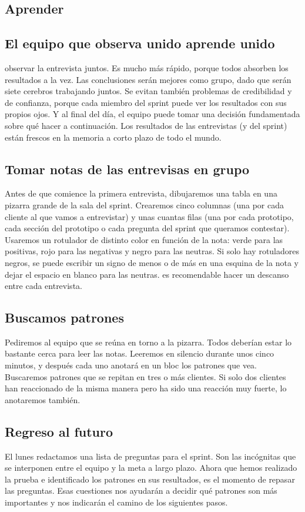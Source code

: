 \documentclass[10pt]{article}
\begin{document}
\begin{multicols}{2}
\section*{Aprender}
\subsection*{El equipo que observa unido aprende unido}
 observar la entrevista juntos. Es mucho más rápido, porque todos absorben los resultados a la vez. Las conclusiones serán mejores como grupo, dado que serán siete cerebros trabajando juntos. Se evitan también problemas de credibilidad y de confianza, porque cada miembro del sprint puede ver los resultados con sus propios ojos. Y al final del día, el equipo puede tomar una decisión fundamentada sobre qué hacer a continuación. Los resultados de las entrevistas (y del sprint) están frescos en la memoria a corto plazo de todo el mundo.
\subsection*{Tomar notas de las entrevisas en grupo}
Antes de que comience la primera entrevista, dibujaremos una tabla en una pizarra grande de la sala del sprint. Crearemos cinco columnas (una por cada cliente al que vamos a entrevistar) y unas cuantas filas (una por cada prototipo, cada sección del prototipo o cada pregunta del sprint que queramos contestar).\\
Usaremos un rotulador de distinto color en función de la nota: verde para las positivas, rojo para las negativas y negro para las neutras. Si solo hay rotuladores negros, se puede escribir un signo de menos o de más en una esquina de la nota y dejar el espacio en blanco para las neutras. es recomendable hacer un descanso entre cada entrevista.\\
\subsection*{Buscamos patrones}
Pediremos al equipo que se reúna en torno a la pizarra. Todos deberían estar lo bastante cerca para leer las notas. Leeremos en silencio durante unos cinco minutos, y después cada uno anotará en un bloc los patrones que vea. Buscaremos patrones que se repitan en tres o más clientes. Si solo dos clientes han reaccionado de la misma manera pero ha sido una reacción muy fuerte, lo anotaremos también.
\subsection*{Regreso al futuro}
El lunes redactamos una lista de preguntas para el sprint. Son las incógnitas que se interponen entre el equipo y la meta a largo plazo. Ahora que hemos realizado la prueba e identificado los patrones en sus resultados, es el momento de repasar las preguntas. Esas cuestiones nos ayudarán a decidir qué patrones son más importantes y nos indicarán el camino de los siguientes pasos.

\end{multicols}
\end{document}
